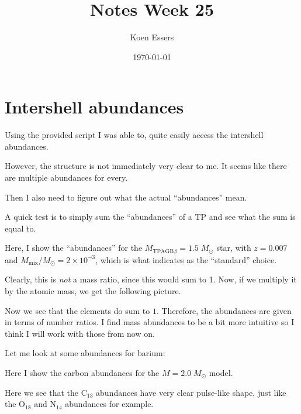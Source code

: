 \documentclass[a4paper,10pt]{article}
\title{Notes Week 25}
\author{Koen Essers}
\date{\today}
\begin{document}
\setuplayout
\section{Intershell abundances}

Using the provided script I was able to, quite easily access the intershell abundances.

However, the structure is not immediately very clear to me. It seems like there are multiple abundances for every.

Then I also need to figure out what the actual ``abundances'' mean.

A quick test is to simply sum the ``abundances'' of a TP and see what the sum is equal to.

Here, I show the ``abundances'' for the \(M_\text{TPAGB,i}=1.5\;M_\odot \) star, with \(z = 0.007\) and \(M_\text{mix} / M_\odot = 2\times 10^{-3} \), which is what \citet{karakas2016} indicates as the ``standard'' choice.

\begin{figure}[ht]
    \centering
\end{figure}

Clearly, this is \emph{not} a mass ratio, since this would sum to 1.
Now, if we multiply it by the atomic mass, we get the following picture.

\begin{figure}[ht]
    \centering
\end{figure}

Now we see that the elements do sum to \(1\). Therefore, the abundances are given in terms of number ratios. I find mass abundances to be a bit more intuitive so I think I will work with those from now on.

Let me look at some abundances for barium:

\begin{figure}[ht]
    \centering
\end{figure}

\begin{figure}[ht]
    \centering
\end{figure}

Here I show the carbon abundances for the \(M=2.0\;M_\odot \) model.
\begin{figure}[ht]
    \centering
\end{figure}
Here we see that the \(\text{C}_{13}\) abundances have very clear pulse-like shape, just like the \(\text{O}_{18}\) and \(\text{N}_{14}\) abundances for example.
\end{document}

